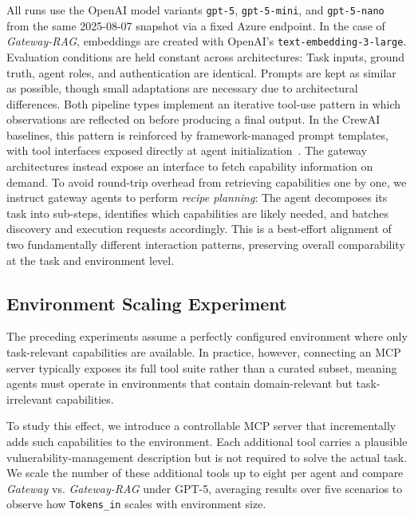 All runs use the OpenAI model variants \texttt{gpt-5}, \texttt{gpt-5-mini}, and \texttt{gpt-5-nano} from the same 2025-08-07 snapshot via a fixed Azure endpoint. 
In the case of \emph{Gateway-RAG}, embeddings are created with OpenAI's \texttt{text-embedding-3-large}.
Evaluation conditions are held constant across architectures: Task inputs, ground truth, agent roles, and authentication are identical.
Prompts are kept as similar as possible, though small adaptations are necessary due to architectural differences. Both pipeline types implement an iterative tool-use pattern in which observations are reflected on before producing a final output. In the CrewAI baselines, this pattern is reinforced by framework-managed prompt templates, with tool interfaces exposed directly at agent initialization~\cite{crewai2025prompts}. The gateway architectures instead expose an interface to fetch capability information on demand. To avoid round-trip overhead from retrieving capabilities one by one, we instruct gateway agents to perform \emph{recipe planning}: The agent decomposes its task into sub-steps, identifies which capabilities are likely needed, and batches discovery and execution requests accordingly. This is a best-effort alignment of two fundamentally different interaction patterns, preserving overall comparability at the task and environment level.

\subsection{Environment Scaling Experiment}\label{env-scaling}

The preceding experiments assume a perfectly configured environment where only task-relevant capabilities are available. In practice, however, connecting an MCP server typically exposes its full tool suite rather than a curated subset, meaning agents must operate in environments that contain domain-relevant but task-irrelevant capabilities.

To study this effect, we introduce a controllable MCP server that incrementally adds such capabilities to the environment. Each additional tool carries a plausible vulnerability-management description but is not required to solve the actual task. We scale the number of these additional tools up to eight per agent and compare \emph{Gateway} vs. \emph{Gateway-RAG} under GPT-5, averaging results over five scenarios to observe how \texttt{Tokens\_in} scales with environment size.
